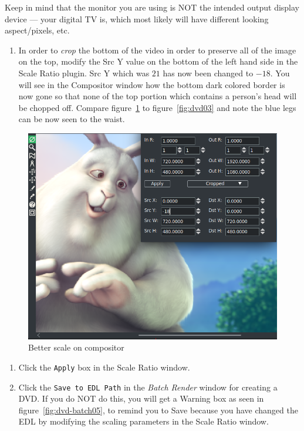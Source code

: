 Keep in mind that the monitor you are using is NOT the intended output display device --- your digital TV is, which most likely will have different looking aspect/pixels, etc.

\begin{enumerate}[start=11]
    \item In order to \textit{crop} the bottom of the video in order to preserve all of the image on the top, modify the Src Y value on the bottom of  the left hand side in the Scale Ratio plugin.  Src Y which was $21$ has now been changed to $-18$.  You will see in the Compositor window how the bottom dark colored border is now gone so that none of the top portion which contains a person's head will be chopped off. Compare figure~\ref{fig:dvd04} to figure~\ref{fig:dvd03} and note the blue legs can be now seen to the waist.
\end{enumerate}

\begin{figure}[htpb]
    \centering
    \includegraphics[width=0.9\linewidth]{images/dvd04.png}
    \caption{Better scale on compositor}
    \label{fig:dvd04}
\end{figure}

\begin{enumerate}[start=12]
    \item Click the \texttt{Apply} box in the Scale Ratio window.
    \item Click the \texttt{Save to EDL Path} in the \textit{Batch Render} window for creating a DVD.  If you do NOT do this, you will get a Warning box as seen in figure~\ref{fig:dvd-batch05}, to remind you to Save because you have changed the EDL by modifying the scaling parameters in the Scale Ratio window.
\end{enumerate}

